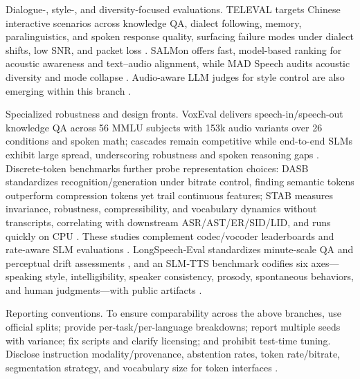\documentclass{article}
\begin{document}
Dialogue-, style-, and diversity-focused evaluations. TELEVAL targets Chinese interactive scenarios across knowledge QA, dialect following, memory, paralinguistics, and spoken response quality, surfacing failure modes under dialect shifts, low SNR, and packet loss \cite{li2025televaldynamicbenchmarkdesignedspokenlan}. SALMon offers fast, model-based ranking for acoustic awareness and text–audio alignment, while MAD Speech audits acoustic diversity and mode collapse \cite{maimon2025salmonsuiteacousticlanguagemodelevaluati,futeral2025madspeechmeasuresacousticdiversity}. Audio-aware LLM judges for style control are also emerging within this branch \cite{chiang2025audioawarelargelanguagemodelsasjudgesspe}.

Specialized robustness and design fronts. VoxEval delivers speech-in/speech-out knowledge QA across 56 MMLU subjects with 153k audio variants over 26 conditions and spoken math; cascades remain competitive while end-to-end SLMs exhibit large spread, underscoring robustness and spoken reasoning gaps \cite{cui2025voxevalbenchmarkingknowledgeunderstandin}. Discrete-token benchmarks further probe representation choices: DASB standardizes recognition/generation under bitrate control, finding semantic tokens outperform compression tokens yet trail continuous features; STAB measures invariance, robustness, compressibility, and vocabulary dynamics without transcripts, correlating with downstream ASR/AST/ER/SID/LID, and runs quickly on CPU \cite{mousavi2024dasbdiscreteaudiospeechbenchmark,vashishth2024stabspeechtokenizerassessmentbenchmark}. These studies complement codec/vocoder leaderboards and rate-aware SLM evaluations \cite{guo2025recentadvancesdiscretespeechtokensreview}. LongSpeech‑Eval standardizes minute-scale QA and perceptual drift assessments \cite{park2025longformspeechgenerationspokenlanguagemo}, and an SLM‑TTS benchmark codifies six axes—speaking style, intelligibility, speaker consistency, prosody, spontaneous behaviors, and human judgments—with public artifacts \cite{wang2024evaluatingtextspeechsynthesislargediscre}.

Reporting conventions. To ensure comparability across the above branches, use official splits; provide per-task/per-language breakdowns; report multiple seeds with variance; fix scripts and clarify licensing; and prohibit test-time tuning. Disclose instruction modality/provenance, abstention rates, token rate/bitrate, segmentation strategy, and vocabulary size for token interfaces \cite{vashishth2024stabspeechtokenizerassessmentbenchmark,entry2025indicsuperbspeechprocessinguniversalperf,noroozi2024instructiondatagenerationunsupervisedada}.

\end{document}

